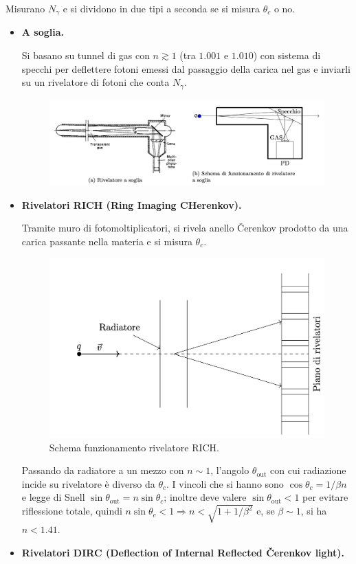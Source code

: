\documentclass[10pt, a4paper]{scrartcl}
\numberwithin{equation}{subsection}
\theoremstyle{style1}
\begin{document}
Misurano $N_\gamma$ e si dividono in due tipi a seconda se si misura $\theta _c$ o no.
\begin{itemize}
	\item \textbf{A soglia.}

		Si basano su tunnel di gas con $n \gtrsim 1$ (tra $1.001$ e $1.010$) con sistema di specchi per deflettere fotoni emessi dal passaggio della carica nel gas e inviarli su un rivelatore di fotoni che conta $N_\gamma$.
		\begin{figure}[h!]
			\centering
			\includegraphics[width=1\columnwidth]{rc-as.png}
		\end{figure}
	\item \textbf{Rivelatori RICH (Ring Imaging CHerenkov).}

		Tramite muro di fotomoltiplicatori, si rivela anello \v Cerenkov prodotto da una carica passante nella materia e si misura $\theta _c$.
		\begin{figure}[h!]
			\centering
			\includegraphics[width=.6\columnwidth]{rc-rich.png}
			\caption{Schema funzionamento rivelatore RICH.}
		\end{figure}

		\noindent Passando da radiatore a un mezzo con $n\sim 1$, l'angolo $\theta _\text{out}$ con cui radiazione incide su rivelatore \`e diverso da $\theta_c$. I vincoli che si hanno sono $\cos \theta _c = 1 / \beta  n$ e legge di Snell $\sin\theta _\text{out} = n \sin \theta _c$; inoltre deve valere $\sin \theta _\text{out}< 1$ per evitare riflessione totale, quindi $n \sin \theta _c < 1 \Rightarrow  n < \sqrt{1 + 1 / \beta ^2} $ e, se $\beta \sim 1$, si ha $n<1.41$.
	\item \textbf{Rivelatori DIRC (Deflection of Internal Reflected \v Cerenkov light).} 


\end{itemize}
\end{document}

